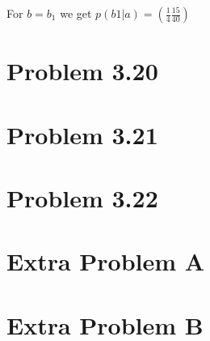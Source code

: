 \documentclass[11pt,a4paper,oneside]{report}
\begin{document}
For $b=b_1$ we get $p(b1|a) = \left( \frac{1}{4} \frac{15}{40} \right)$

\section*{Problem 3.20}


\section*{Problem 3.21}


\section*{Problem 3.22}


\section*{Extra Problem A}


\section*{Extra Problem B}
\end{document}
